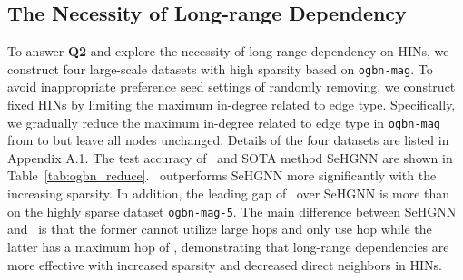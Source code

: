  
\subsection{The Necessity of Long-range Dependency}
To answer \textbf{Q2} and explore the necessity of long-range dependency on HINs, we construct four large-scale datasets with high sparsity based on \texttt{ogbn-mag}. To avoid inappropriate preference seed settings of randomly removing, we construct fixed HINs by limiting the maximum in-degree related to edge type. Specifically, we gradually reduce the maximum in-degree related to edge type in \texttt{ogbn-mag} from  to  but leave all nodes unchanged. Details of the four datasets are listed in Appendix A.1.     
The test accuracy of \model~and SOTA method SeHGNN are shown in Table~\ref{tab:ogbn_reduce}. 
\model~outperforms SeHGNN more significantly with the increasing sparsity. In addition, the leading gap of \model~over SeHGNN is more than  on the highly sparse dataset \texttt{ogbn-mag-5}. The main difference between SeHGNN and \model~is that the former cannot utilize large hops and only use hop  while the latter has a maximum hop of , demonstrating that long-range dependencies are more effective with increased sparsity and decreased direct neighbors in HINs.





